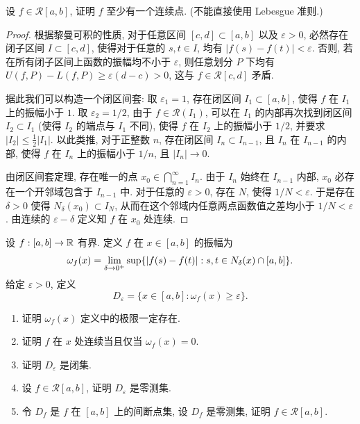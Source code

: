 \documentclass{article}
\begin{document}
\begin{problem}
设 $f \in \mathcal{R}[a,b]$, 证明 $f$ 至少有一个连续点. (不能直接使用 Lebesgue 准则.)
\end{problem}

\begin{proof}
  根据黎曼可积的性质, 对于任意区间 \( [c,d] \subset [a,b] \) 以及 \( \varepsilon > 0 \), 必然存在闭子区间 \( I \subset [c,d] \), 使得对于任意的 \( s,t\in I \), 均有 \( |f(s)-f(t)| < \varepsilon \). 否则, 若在所有闭子区间上函数的振幅均不小于 \( \varepsilon \), 则任意划分 \( P \) 下均有 \( U(f,P)-L(f,P) \ge \varepsilon(d-c) > 0 \), 这与 \( f \in \mathcal{R}[c,d] \) 矛盾.

  据此我们可以构造一个闭区间套: 
  取 \( \varepsilon_1 = 1 \), 存在闭区间 \( I_1 \subset [a,b] \), 使得 \( f \) 在 \( I_1 \) 上的振幅小于 \( 1 \).
  取 \( \varepsilon_2 = 1/2 \), 由于 \( f \in \mathcal{R}(I_1) \), 可以在 \( I_1 \) 的内部再次找到闭区间 \( I_2 \subset I_1 \) (使得 \( I_2 \) 的端点与 \( I_1 \) 不同), 使得 \( f \) 在 \( I_2 \) 上的振幅小于 \( 1/2 \), 并要求 \( |I_2| \le \frac{1}{2}|I_1| \).
  以此类推, 对于正整数 \( n \), 存在闭区间 \( I_n \subset I_{n-1} \), 且 \( I_n \) 在 \( I_{n-1} \) 的内部, 使得 \( f \) 在 \( I_n \) 上的振幅小于 \( 1/n \), 且 \( |I_n| \to 0 \).

  由闭区间套定理, 存在唯一的点 \( x_0 \in \bigcap_{n=1}^\infty I_n \). 由于 \( I_n \) 始终在 \( I_{n-1} \) 内部, \( x_0 \) 必存在一个开邻域包含于 \( I_{n-1} \) 中. 对于任意的 \( \varepsilon > 0 \), 存在 \( N \), 使得 \( 1/N < \varepsilon \). 于是存在 \( \delta > 0 \) 使得 \( N_\delta(x_0) \subset I_N \), 从而在这个邻域内任意两点函数值之差均小于 \( 1/N < \varepsilon \). 由连续的 \(\varepsilon-\delta\) 定义知 \( f \) 在 \( x_0 \) 处连续.
\end{proof}



\begin{problem}
设 $f:[a,b] \to \mathbb{R}$ 有界. 定义 $f$ 在 $x \in [a,b]$ 的振幅为
\[
\omega_f(x) = \lim_{\delta \to 0^+} \sup\{\left|f(s) - f(t)\right| : s,t \in N_\delta(x) \cap [a,b]\}.
\]
给定 $\varepsilon > 0$, 定义
\[
D_\varepsilon = \{x \in [a,b] : \omega_f(x) \ge \varepsilon\}.
\]
\begin{enumerate}[label=(\alph*)]
	\item 证明 $\omega_f(x)$ 定义中的极限一定存在.
	\item 证明 $f$ 在 $x$ 处连续当且仅当 $\omega_f(x)=0$.
	\item 证明 $D_\varepsilon$ 是闭集.
	\item 设 $f \in \mathcal{R}[a,b]$, 证明 $D_\varepsilon$ 是零测集.
	\item 令 $D_f$ 是 $f$ 在 $[a,b]$ 上的间断点集, 设 $D_f$ 是零测集, 证明 $f \in \mathcal{R}[a,b]$.
\end{enumerate}
\end{problem}
\end{document}
